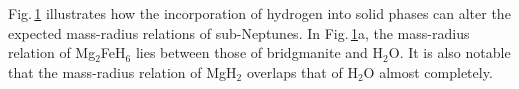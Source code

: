 \documentclass[draft,jgrga,12pt]{agujournal2019}
\begin{document}
\begin{figure}
{%
}
\label{fig:M-R}
\end{figure}


Fig.\,\ref{fig:M-R} illustrates how the incorporation of hydrogen into solid phases can alter the expected mass-radius relations of sub-Neptunes. 
In Fig.\,\ref{fig:M-R}a, the mass-radius relation of Mg$_2$FeH$_6$ lies between those of bridgmanite and H$_2$O.
It is also notable that the mass-radius relation of MgH$_2$ overlaps that of H$_2$O almost completely.
\end{document}
